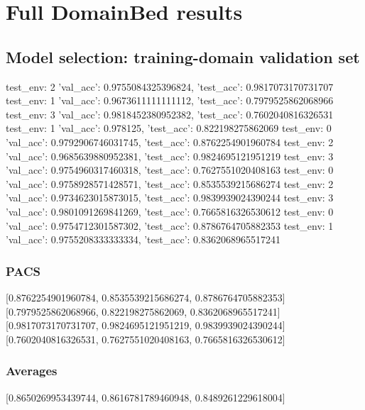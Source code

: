 \documentclass{article}
\begin{document}
\section{Full DomainBed results}

\subsection{Model selection: training-domain validation set}
test_env: 2
{'val_acc': 0.9755084325396824, 'test_acc': 0.9817073170731707}
test_env: 1
{'val_acc': 0.9673611111111112, 'test_acc': 0.7979525862068966}
test_env: 3
{'val_acc': 0.9818452380952382, 'test_acc': 0.7602040816326531}
test_env: 1
{'val_acc': 0.978125, 'test_acc': 0.822198275862069}
test_env: 0
{'val_acc': 0.9792906746031745, 'test_acc': 0.8762254901960784}
test_env: 2
{'val_acc': 0.9685639880952381, 'test_acc': 0.9824695121951219}
test_env: 3
{'val_acc': 0.9754960317460318, 'test_acc': 0.7627551020408163}
test_env: 0
{'val_acc': 0.9758928571428571, 'test_acc': 0.8535539215686274}
test_env: 2
{'val_acc': 0.9734623015873015, 'test_acc': 0.9839939024390244}
test_env: 3
{'val_acc': 0.9801091269841269, 'test_acc': 0.7665816326530612}
test_env: 0
{'val_acc': 0.9754712301587302, 'test_acc': 0.8786764705882353}
test_env: 1
{'val_acc': 0.9755208333333334, 'test_acc': 0.8362068965517241}

\subsubsection{PACS}
[0.8762254901960784, 0.8535539215686274, 0.8786764705882353]
[0.7979525862068966, 0.822198275862069, 0.8362068965517241]
[0.9817073170731707, 0.9824695121951219, 0.9839939024390244]
[0.7602040816326531, 0.7627551020408163, 0.7665816326530612]

\begin{center}
\end{center}

\subsubsection{Averages}
[0.8650269953439744, 0.8616781789460948, 0.8489261229618004]

\begin{center}
\end{center}
\end{document}
